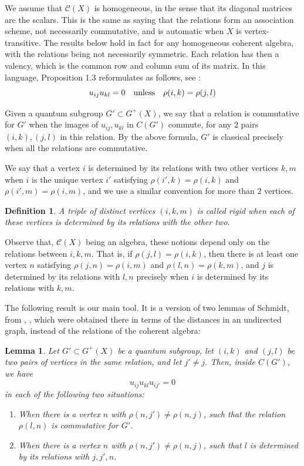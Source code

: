 \documentclass[11pt]{amsart}
\newtheorem{lemma}[theorem]{Lemma}
\newtheorem{definition}[theorem]{Definition}
\newcommand{\C}{\mathcal C}
\begin{document}
We assume that $\C(X)$ is homogeneous, in the sense that its diagonal matrices are the scalars. This is the same as saying that the relations form an association scheme, not necessarily commutative, and is automatic when $X$ is vertex-transitive. The results below hold in fact for any homogeneous coherent algebra, with the relations being not necessarily symmetric. Each relation has then a valency, which is the common row and column sum of its matrix. In this language, Proposition 1.3 reformulates as follows, see \cite{lmr}:
$$u_{ij}u_{kl}=0\quad{\rm unless}\quad\rho(i,k)=\rho(j,l)$$

Given a quantum subgroup $G'\subset G^+(X)$, we say that a relation is commutative for $G'$ when the images of $u_{ij},u_{kl}$ in $C(G')$ commute, for any $2$ pairs $(i,k),(j,l)$ in this relation. By the above formula, $G'$ is classical precisely when all the relations are commutative.

We say that a vertex $i$ is determined by its relations with two other vertices $k,m$ when $i$ is the unique vertex $i'$ satisfying $\rho(i',k)=\rho(i,k)$ and $\rho(i',m)=\rho(i,m)$, and we use a similar convention for more than $2$ vertices.

\begin{definition}
A triple of distinct vertices $(i,k,m)$ is called rigid when each of these vertices is determined by its relations with the other two.
\end{definition}

Observe that, $\C(X)$ being an algebra, these notions depend only on the relations between $i,k,m$. That is, if $\rho(j,l)=\rho(i,k)$, then there is at least one vertex $n$ satisfying $\rho(j,n)=\rho(i,m)$ and $\rho(l,n)=\rho(k,m)$, and $j$ is determined by its relations with $l,n$ precisely when $i$ is determined by its relations with $k,m$.

The following result is our main tool. It is a version of two lemmas of Schmidt, from \cite{scd}, \cite{sc2}, which were obtained there in terms of the distances in an undirected graph, instead of the relations of the coherent algebra:

\begin{lemma}
Let $G'\subset G^+(X)$ be a quantum subgroup, let $(i,k)$ and $(j,l)$ be two pairs of vertices in the same relation, and let $j'\neq j$. Then, inside $C(G')$, we have
$$u_{ij}u_{kl}u_{ij'}=0$$
in each of the following two situations:
\begin{enumerate}
\item When there is a vertex $n$ with $\rho(n,j')\neq\rho(n,j)$, such that the relation $\rho(l,n)$ is commutative for $G'$.
\item When there is a vertex $n$ with $\rho(n,j')\neq\rho(n,j)$, such that $l$ is determined by its relations with $j,j',n$.
\end{enumerate}
\end{lemma}
\end{document}
